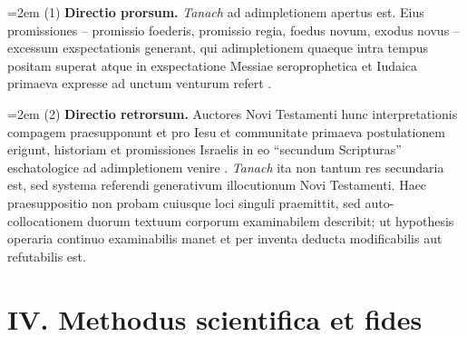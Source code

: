 \documentclass[11pt,a4paper]{article}
\newcommand{\subpar}[1]{%
  \begingroup
  \leftskip=2em %
  \noindent#1\par
  \endgroup
}
\begin{document}
\subpar{(1) \textbf{Directio prorsum.} \textit{Tanach} ad adimpletionem apertus est. Eius promissiones -- promissio foederis, promissio regia, foedus novum, exodus novus -- excessum exspectationis generant, qui adimpletionem quaeque intra tempus positam superat atque in exspectatione Messiae seroprophetica et Iudaica primaeva expresse ad unctum venturum refert \citep{zimmerli1952,vonrad1960,mowinckel1956,collins2010}.}

\subpar{(2) \textbf{Directio retrorsum.} Auctores Novi Testamenti hunc interpretationis compagem praesupponunt et pro Iesu et communitate primaeva postulationem erigunt, historiam et promissiones Israelis in eo ``secundum Scripturas'' eschatologice ad adimpletionem venire \citep{dodd1952,goppelt1939,hays1989,huebner1990,wright1992}. \textit{Tanach} ita non tantum res secundaria est, sed systema referendi generativum illocutionum Novi Testamenti. Haec praesuppositio non probam cuiusque loci singuli praemittit, sed auto-collocationem duorum textuum corporum examinabilem describit; ut hypothesis operaria continuo examinabilis manet et per inventa deducta modificabilis aut refutabilis est.}

\section*{IV. Methodus scientifica et fides}
\end{document}
